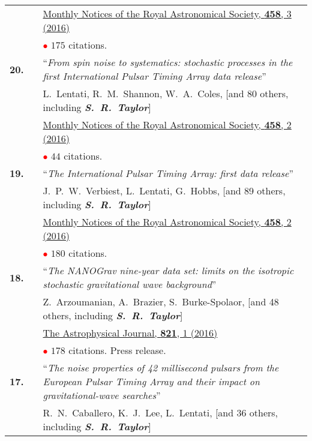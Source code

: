 \documentclass[11pt,letterpaper,sans]{moderncv}
\begin{document}
{\begin{longtable}{rp{0.3cm}p{15.8cm}}
&&  \href{http://mnras.oxfordjournals.org/content/458/3/3341}{{\color{color1} Monthly Notices of the Royal Astronomical Society, \textbf{458}, 3 (2016)}} \\
&& \textcolor{red}{$\bullet$} $175$ citations. \vspace{0.09cm}\\
\textbf{20.} & & ``\textit{From spin noise to systematics: stochastic processes in the first International Pulsar Timing Array data release}'' \\ 
&& L.~Lentati, R.~M.~Shannon, W.~A.~Coles, [and 80 others, including \textit{\textbf{S.~R.~Taylor}}] \\ 
&&  \href{http://mnras.oxfordjournals.org/content/458/2/2161}{{\color{color1} Monthly Notices of the Royal Astronomical Society, \textbf{458}, 2 (2016)}} \\
&& \textcolor{red}{$\bullet$} $44$ citations. \vspace{0.09cm}\\
\textbf{19.} & & ``\textit{The International Pulsar Timing Array: first data release}'' \\ 
&& J.~P.~W.~Verbiest, L.~Lentati, G.~Hobbs, [and 89 others, including \textit{\textbf{S.~R.~Taylor}}] \\ 
&&  \href{http://mnras.oxfordjournals.org/content/458/2/1267}{{\color{color1} Monthly Notices of the Royal Astronomical Society, \textbf{458}, 2 (2016)}} \\
&& \textcolor{red}{$\bullet$} $180$ citations. \vspace{0.09cm}\\
\textbf{18.} & & ``\textit{The NANOGrav nine-year data set: limits on the isotropic stochastic gravitational wave background}'' \\ 
&& Z.~Arzoumanian, A.~Brazier, S.~Burke-Spolaor, [and 48 others, including \textit{\textbf{S.~R.~Taylor}}] \\ 
&&  \href{http://iopscience.iop.org/article/10.3847/0004-637X/821/1/13/meta}{{\color{color1} The Astrophysical Journal, \textbf{821}, 1 (2016)}} \\
&& \textcolor{red}{$\bullet$} $178$ citations. Press release. \vspace{0.09cm}\\
\textbf{17.} & & ``\textit{The noise properties of 42 millisecond pulsars from the European Pulsar Timing Array and their impact on gravitational-wave searches}'' \\ 
&& R.~N.~Caballero, K.~J.~Lee, L.~Lentati, [and 36 others, including \textit{\textbf{S.~R.~Taylor}}] \\ 

\end{longtable}}
\end{document}
